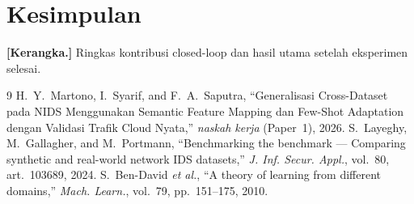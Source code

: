 \documentclass[11pt,a4paper]{article}
\begin{document}
\section{Kesimpulan}
\label{sec:conclusion}
\textbf{[Kerangka.]} Ringkas kontribusi closed-loop dan hasil utama setelah
eksperimen selesai.

\begin{thebibliography}{9}
 H.~Y.~Martono, I.~Syarif, and F.~A.~Saputra, ``Generalisasi
Cross-Dataset pada NIDS Menggunakan Semantic Feature Mapping dan Few-Shot
Adaptation dengan Validasi Trafik Cloud Nyata,'' \emph{naskah kerja} (Paper~1),
2026.
 S.~Layeghy, M.~Gallagher, and M.~Portmann, ``Benchmarking the
benchmark --- Comparing synthetic and real-world network IDS datasets,''
\emph{J. Inf. Secur. Appl.}, vol.~80, art.~103689, 2024.
 S.~Ben-David \emph{et al.}, ``A theory of learning from
different domains,'' \emph{Mach. Learn.}, vol.~79, pp.~151--175, 2010.
\end{thebibliography}
\end{document}
